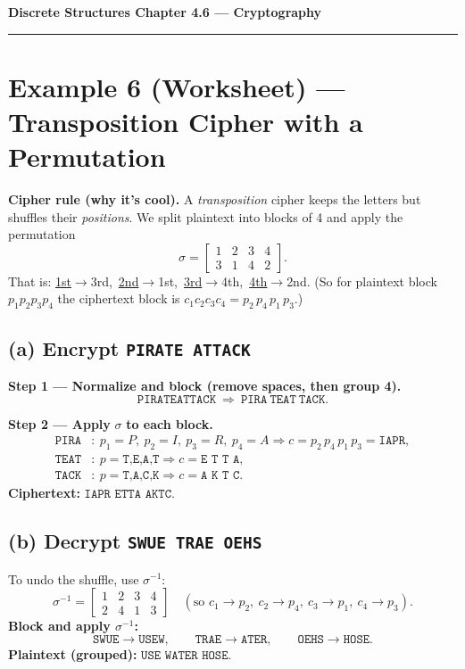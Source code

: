 \documentclass[12pt]{article}
\begin{document}
{\large \textbf{Discrete Structures \quad Chapter 4.6 — Cryptography}}

\hrule
\vspace{0.6em}

\section*{Example 6 (Worksheet) — Transposition Cipher with a Permutation}

\textbf{Cipher rule (why it’s cool).}  
A \emph{transposition} cipher keeps the letters but shuffles their \emph{positions}.  
We split plaintext into blocks of 4 and apply the permutation
\[
\sigma = \begin{bmatrix}1&2&3&4\\ 3&1&4&2\end{bmatrix}.
\]
That is: \underline{1st}\(\to\)3rd,\ \underline{2nd}\(\to\)1st,\ \underline{3rd}\(\to\)4th,\ \underline{4th}\(\to\)2nd.  
(So for plaintext block \(p_1p_2p_3p_4\) the ciphertext block is \(c_1c_2c_3c_4 = p_2\,p_4\,p_1\,p_3\).)

\subsection*{(a) Encrypt \texttt{PIRATE ATTACK}}
\textbf{Step 1 — Normalize and block (remove spaces, then group 4).}
\[
\texttt{PIRATEATTACK} \ \Rightarrow\ \texttt{PIRA}\ \texttt{TEAT}\ \texttt{TACK}.
\]

\textbf{Step 2 — Apply }\(\sigma\) \textbf{to each block.}
\[
\begin{aligned}
\texttt{PIRA}&:\ p_1\!=\!P,\ p_2\!=\!I,\ p_3\!=\!R,\ p_4\!=\!A \Rightarrow c = p_2\,p_4\,p_1\,p_3 = \texttt{IAPR},\\
\texttt{TEAT}&:\ p=\texttt{T,E,A,T} \Rightarrow c=\texttt{E T T A},\\
\texttt{TACK}&:\ p=\texttt{T,A,C,K} \Rightarrow c=\texttt{A K T C}.
\end{aligned}
\]
\textbf{Ciphertext:} \(\boxed{\texttt{IAPR ETTA AKTC}}\).

\subsection*{(b) Decrypt \texttt{SWUE TRAE OEHS}}
To undo the shuffle, use \(\sigma^{-1}\):
\[
\sigma^{-1}=\begin{bmatrix}1&2&3&4\\ 2&4&1&3\end{bmatrix}
\quad(\text{so } c_1\!\to\!p_2,\ c_2\!\to\!p_4,\ c_3\!\to\!p_1,\ c_4\!\to\!p_3).
\]
\textbf{Block and apply \(\sigma^{-1}\):}
\[
\texttt{SWUE}\!\to\!\texttt{USEW},\qquad
\texttt{TRAE}\!\to\!\texttt{ATER},\qquad
\texttt{OEHS}\!\to\!\texttt{HOSE}.
\]
\textbf{Plaintext (grouped):} \(\boxed{\texttt{USE WATER HOSE}}\).
\end{document}
